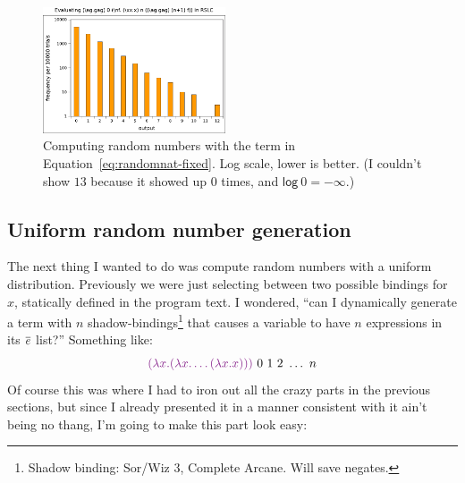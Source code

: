 \documentclass[10pt]{sigplanconf}
\newcommand{\x}[1]{\lstinline{#1}}
\begin{document}
\begin{figure}[h!]
	\begin{center}
	\includegraphics[width=0.48\textwidth]{rslc-naturals.pdf}
	\end{center}
	\caption{Computing random numbers with the term in Equation~\ref{eq:randomnat-fixed}. Log scale, lower is better. (I couldn't show $13$ because it showed up 0 times, and $\mathsf{log}~0 = -\infty$.)}
	\label{fig:nats}
\end{figure}

\subsection{Uniform random number generation}

\newcommand{\thing}[1]{\textcolor{Fuchsia}{#1}}

The next thing I wanted to do was compute random numbers with a uniform distribution. Previously we were just selecting between two possible bindings for $x$, statically defined in the program text. I wondered, ``can I dynamically generate a term with $n$ shadow-bindings\footnote{Shadow binding: Sor/Wiz 3, Complete Arcane. Will save negates.} that causes a variable to have $n$ expressions in its $\overline{e}$ list?'' Something like:
\[
\thing{(\lambda x. (\lambda x. \dots (\lambda x.x)))}~0~1~2~\dots~n
\]
Of course this was where I had to iron out all the crazy parts in the previous sections, but since I already presented it in a manner consistent with it ain't being no thang, I'm going to make this part look easy:
\end{document}
